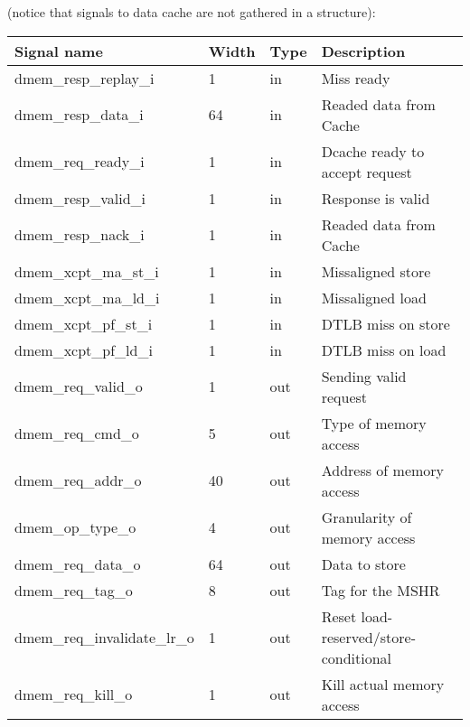 (notice that signals to data cache are not gathered in a structure):

\begin{table}[H]
\centering
\begin{tabular}{llll}
\textbf{Signal name} & \textbf{Width} & \textbf{Type} & \textbf{Description} \\
\hline
dmem\_resp\_replay\_i & 1 & in & Miss ready \\
dmem\_resp\_data\_i & 64 & in & Readed data from Cache \\
dmem\_req\_ready\_i & 1 & in & Dcache ready to accept request \\
dmem\_resp\_valid\_i & 1 & in & Response is valid \\
dmem\_resp\_nack\_i & 1 & in & Readed data from Cache \\
dmem\_xcpt\_ma\_st\_i & 1 & in & Missaligned store \\
dmem\_xcpt\_ma\_ld\_i & 1 & in & Missaligned load \\
dmem\_xcpt\_pf\_st\_i & 1 & in & DTLB miss on store \\
dmem\_xcpt\_pf\_ld\_i & 1 & in & DTLB miss on load \\

dmem\_req\_valid\_o & 1 & out & Sending valid request \\
dmem\_req\_cmd\_o & 5 & out & Type of memory access \\
dmem\_req\_addr\_o & 40 & out & Address of memory access \\
dmem\_op\_type\_o & 4 & out & Granularity of memory access \\
dmem\_req\_data\_o & 64 & out & Data to store \\
dmem\_req\_tag\_o & 8 & out & Tag for the MSHR \\
dmem\_req\_invalidate\_lr\_o & 1 & out & Reset load-reserved/store-conditional \\
dmem\_req\_kill\_o & 1 & out & Kill actual memory access \\
\end{tabular}
\end{table}
